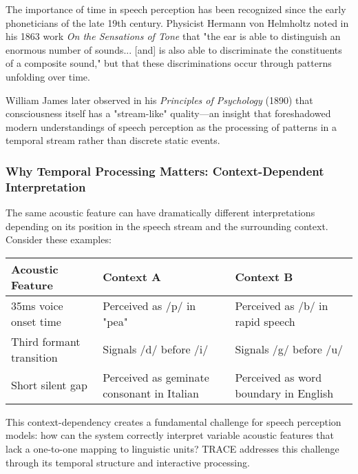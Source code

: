 \documentclass[12pt,a4paper]{article}
\begin{document}
The importance of time in speech perception has been recognized since the early phoneticians of the late 19th century. Physicist Hermann von Helmholtz noted in his 1863 work \textit{On the Sensations of Tone} that "the ear is able to distinguish an enormous number of sounds... [and] is also able to discriminate the constituents of a composite sound," but that these discriminations occur through patterns unfolding over time.

William James later observed in his \textit{Principles of Psychology} (1890) that consciousness itself has a "stream-like" quality—an insight that foreshadowed modern understandings of speech perception as the processing of patterns in a temporal stream rather than discrete static events.

\subsubsection{Why Temporal Processing Matters: Context-Dependent Interpretation}

The same acoustic feature can have dramatically different interpretations depending on its position in the speech stream and the surrounding context. Consider these examples:

\begin{tcolorbox}[enhanced, colback=green!5, colframe=green!75!black, title=Context-Dependent Acoustic Features]
\begin{tabular}{|p{3.5cm}|p{3.5cm}|p{3.5cm}|}
\hline
\textbf{Acoustic Feature} & \textbf{Context A} & \textbf{Context B} \\
\hline
35ms voice onset time & Perceived as /p/ in "pea" & Perceived as /b/ in rapid speech \\
\hline
Third formant transition & Signals /d/ before /i/ & Signals /g/ before /u/ \\
\hline
Short silent gap & Perceived as geminate consonant in Italian & Perceived as word boundary in English \\
\hline
\end{tabular}
\end{tcolorbox}

This context-dependency creates a fundamental challenge for speech perception models: how can the system correctly interpret variable acoustic features that lack a one-to-one mapping to linguistic units? TRACE addresses this challenge through its temporal structure and interactive processing.
\end{document}
